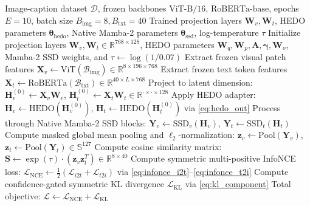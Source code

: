 \documentclass[conference]{IEEEtran}
\begin{document}
\begin{algorithm}[htbp]
\caption{Training Procedure for Native Mamba-2 + HEDO}
\label{alg:training}
\begin{algorithmic}[1]
\REQUIRE Image-caption dataset $\mathcal{D}$, frozen backbones $\mathrm{ViT\text{-}B/16}$, $\mathrm{RoBERTa\text{-}base}$, epochs $E=10$, batch size $B_{\mathrm{img}}=8, B_{\mathrm{txt}}=40$
\ENSURE Trained projection layers $\mathbf{W}_v, \mathbf{W}_t$, HEDO parameters $\boldsymbol{\theta}_{\mathrm{hedo}}$, Native Mamba-2 parameters $\boldsymbol{\theta}_{\mathrm{ssd}}$, log-temperature $\tau$
\STATE Initialize projection layers $\mathbf{W}_v, \mathbf{W}_t \in \mathbb{R}^{768 \times 128}$, HEDO parameters $\mathbf{W}_q, \mathbf{W}_p, \mathbf{A}, \boldsymbol{\gamma}, \mathbf{W}_o$, Mamba-2 SSD weights, and $\tau \leftarrow \log(1/0.07)$
        \STATE Extract frozen visual patch features $\mathbf{X}_v \leftarrow \mathrm{ViT}(\mathcal{B}_{\mathrm{img}}) \in \mathbb{R}^{8 \times 196 \times 768}$
        \STATE Extract frozen text token features $\mathbf{X}_t \leftarrow \mathrm{RoBERTa}(\mathcal{B}_{\mathrm{txt}}) \in \mathbb{R}^{40 \times L \times 768}$
        \STATE Project to latent dimension: $\mathbf{H}_v^{(0)} \leftarrow \mathbf{X}_v \mathbf{W}_v$, $\mathbf{H}_t^{(0)} \leftarrow \mathbf{X}_t \mathbf{W}_t \in \mathbb{R}^{\cdot \times \cdot \times 128}$
        \STATE Apply HEDO adapter: $\mathbf{H}_v \leftarrow \mathrm{HEDO}(\mathbf{H}_v^{(0)})$, $\mathbf{H}_t \leftarrow \mathrm{HEDO}(\mathbf{H}_t^{(0)})$ via \eqref{eq:hedo_out}
        \STATE Process through Native Mamba-2 SSD blocks: $\mathbf{Y}_v \leftarrow \mathrm{SSD}_v(\mathbf{H}_v)$, $\mathbf{Y}_t \leftarrow \mathrm{SSD}_t(\mathbf{H}_t)$
        \STATE Compute masked global mean pooling and $\ell_2$-normalization: $\mathbf{z}_v \leftarrow \mathrm{Pool}(\mathbf{Y}_v)$, $\mathbf{z}_t \leftarrow \mathrm{Pool}(\mathbf{Y}_t) \in \mathbb{S}^{127}$
        \STATE Compute cosine similarity matrix: $\mathbf{S} \leftarrow \exp(\tau) \cdot (\mathbf{z}_v \mathbf{z}_t^T) \in \mathbb{R}^{8 \times 40}$
        \STATE Compute symmetric multi-positive InfoNCE loss: $\mathcal{L}_{\mathrm{NCE}} \leftarrow \frac{1}{2}(\mathcal{L}_{i2t} + \mathcal{L}_{t2i})$ via \eqref{eq:infonce_i2t}--\eqref{eq:infonce_t2i}
            \STATE Compute confidence-gated symmetric KL divergence $\mathcal{L}_{\mathrm{KL}}$ via \eqref{eq:kl_component}
            \STATE Total objective: $\mathcal{L} \leftarrow \mathcal{L}_{\mathrm{NCE}} + \mathcal{L}_{\mathrm{KL}}$

\end{algorithmic}
\end{algorithm}
\end{document}
